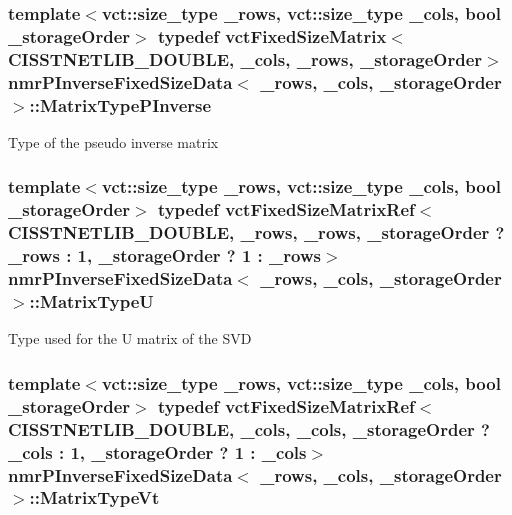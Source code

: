 \hypertarget{classnmr_p_inverse_fixed_size_data_a6c4787ecd9e2e7155fd857fb4427c7b0}{
\subsubsection[{Matrix\-Type\-P\-Inverse}]{\setlength{\rightskip}{0pt plus 5cm}template$<$vct\-::size\-\_\-type \-\_\-rows, vct\-::size\-\_\-type \-\_\-cols, bool \-\_\-storage\-Order$>$ typedef {\bf vct\-Fixed\-Size\-Matrix}$<$C\-I\-S\-S\-T\-N\-E\-T\-L\-I\-B\-\_\-\-D\-O\-U\-B\-L\-E, \-\_\-cols, \-\_\-rows, \-\_\-storage\-Order$>$ {\bf nmr\-P\-Inverse\-Fixed\-Size\-Data}$<$ \-\_\-rows, \-\_\-cols, \-\_\-storage\-Order $>$\-::{\bf Matrix\-Type\-P\-Inverse}}}\label{classnmr_p_inverse_fixed_size_data_a6c4787ecd9e2e7155fd857fb4427c7b0}
Type of the pseudo inverse matrix \hypertarget{classnmr_p_inverse_fixed_size_data_aef6864d119646cca01fc7a27d9eec4fa}{
\subsubsection[{Matrix\-Type\-U}]{\setlength{\rightskip}{0pt plus 5cm}template$<$vct\-::size\-\_\-type \-\_\-rows, vct\-::size\-\_\-type \-\_\-cols, bool \-\_\-storage\-Order$>$ typedef {\bf vct\-Fixed\-Size\-Matrix\-Ref}$<$C\-I\-S\-S\-T\-N\-E\-T\-L\-I\-B\-\_\-\-D\-O\-U\-B\-L\-E, \-\_\-rows, \-\_\-rows, \-\_\-storage\-Order ? \-\_\-rows \-: 1, \-\_\-storage\-Order ? 1 \-: \-\_\-rows$>$ {\bf nmr\-P\-Inverse\-Fixed\-Size\-Data}$<$ \-\_\-rows, \-\_\-cols, \-\_\-storage\-Order $>$\-::{\bf Matrix\-Type\-U}}}\label{classnmr_p_inverse_fixed_size_data_aef6864d119646cca01fc7a27d9eec4fa}
Type used for the U matrix of the S\-V\-D \hypertarget{classnmr_p_inverse_fixed_size_data_a61bc7c8325cf61f5c530759364ce185a}{
\subsubsection[{Matrix\-Type\-Vt}]{\setlength{\rightskip}{0pt plus 5cm}template$<$vct\-::size\-\_\-type \-\_\-rows, vct\-::size\-\_\-type \-\_\-cols, bool \-\_\-storage\-Order$>$ typedef {\bf vct\-Fixed\-Size\-Matrix\-Ref}$<$C\-I\-S\-S\-T\-N\-E\-T\-L\-I\-B\-\_\-\-D\-O\-U\-B\-L\-E, \-\_\-cols, \-\_\-cols, \-\_\-storage\-Order ? \-\_\-cols \-: 1, \-\_\-storage\-Order ? 1 \-: \-\_\-cols$>$ {\bf nmr\-P\-Inverse\-Fixed\-Size\-Data}$<$ \-\_\-rows, \-\_\-cols, \-\_\-storage\-Order $>$\-::{\bf Matrix\-Type\-Vt}}}\label{classnmr_p_inverse_fixed_size_data_a61bc7c8325cf61f5c530759364ce185a}
